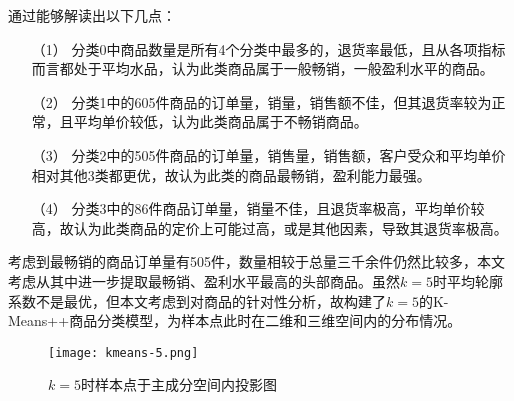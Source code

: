 \documentclass[lang=cn,11pt,a4paper,cite=authoryear]{elegantpaper}
\begin{document}
通过能够解读出以下几点：
\begin{itemize}
  \item [（1）] 分类0中商品数量是所有4个分类中最多的，退货率最低，且从各项指标而言都处于平均水品，认为此类商品属于一般畅销，一般盈利水平的商品。 
  \item [（2）]
  分类1中的605件商品的订单量，销量，销售额不佳，但其退货率较为正常，且平均单价较低，认为此类商品属于不畅销商品。
  \item [（3）]
  分类2中的505件商品的订单量，销售量，销售额，客户受众和平均单价相对其他3类都更优，故认为此类的商品最畅销，盈利能力最强。  
  \item[（4）]
  分类3中的86件商品订单量，销量不佳，且退货率极高，平均单价较高，故认为此类商品的定价上可能过高，或是其他因素，导致其退货率极高。
  
\end{itemize}

考虑到最畅销的商品订单量有505件，数量相较于总量三千余件仍然比较多，本文考虑从其中进一步提取最畅销、盈利水平最高的头部商品。虽然$k=5$时平均轮廓系数不是最优，但本文考虑到对商品的针对性分析，故构建了$k=5$的K-Means++商品分类模型，为样本点此时在二维和三维空间内的分布情况。
\begin{figure}[H]
  \centering
  \texttt{[image: kmeans-5.png]}
  \caption{$k=5$时样本点于主成分空间内投影图}
  \label{5聚类二维三维图}
\end{figure}
\end{document}
